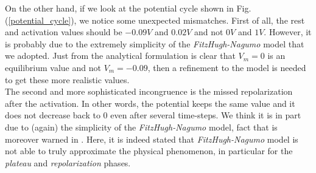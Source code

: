 \documentclass[a4paper,11pt]{article}
\begin{document}
\noindent On the other hand, if we look at the potential cycle shown in Fig. (\ref{potential_cycle}), we notice some unexpected mismatches. First of all, the rest and activation values should be $-0.09V$ and $0.02V$ and not $0V$ and $1V$. However, it is probably due to the extremely simplicity of the \emph{FitzHugh-Nagumo} model that we adopted. Just from the analytical formulation is clear that $V_m=0$ is an equilibrium value and not $V_m=-0.09$, then a refinement to the model is needed to get these more realistic values. \\
The second and more sophisticated incongruence is the missed repolarization after the activation. In other words, the potential keeps the same value and it does not decrease back to 0 even after several time-steps. We think it is in part due to (again) the simplicity of the \emph{FitzHugh-Nagumo} model, fact that is moreover warned in \cite{colli_franzone_parallel}. Here, it is indeed stated that \emph{FitzHugh-Nagumo} model is not able to truly approximate the physical phenomenon, in particular for the \emph{plateau} and \emph{repolarization} phases.
\end{document}
